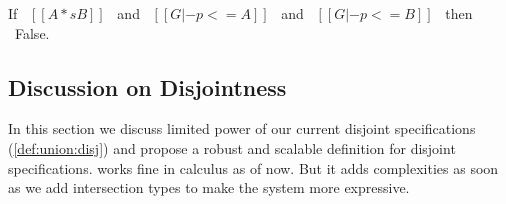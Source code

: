 \begin{lemma}
\label{lemma:union:check-both-disj-false}
If \ $[[A *s B]]$ \ and \ $[[G |- p <= A]]$ \ and \ $[[G |- p <= B]]$ \ then \ False.
\end{lemma}


\subsection{Discussion on Disjointness}
\label{sec:union:discussion}
In this section we discuss limited power of our current disjoint specifications 
(\cref{def:union:disj}) and propose a robust and scalable definition for disjoint specifications.
 works fine in calculus as of now. But it adds complexities as soon as we add
intersection types to make the system more expressive.